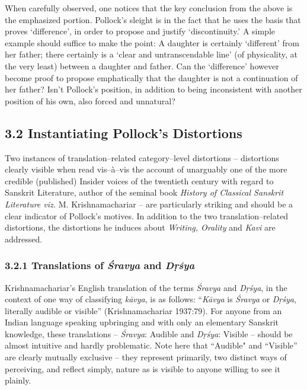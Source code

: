 \vskip 4pt

When carefully observed, one notices that the key conclusion from the above is the emphasized portion. Pollock’s sleight is in the fact that he uses the basis that proves ‘difference’, in order to propose and justify ‘discontinuity.’ A simple example should suffice to make the point: A daughter is certainly ‘different’ from her father; there certainly is a ‘clear and untranscendable line’ (of physicality, at the very least) between a daughter and father. Can the ‘difference’ however become proof to propose emphatically that the daughter is not a continuation of her father? Isn’t Pollock’s position, in addition to being inconsistent with another position of his own, also forced and unnatural?


\subsection*{3.2 Instantiating Pollock’s Distortions}

Two instances of translation–related category–level distortions – distortions clearly visible when read vis–à–vis the account of unarguably one of the more credible (published) Insider voices of the twentieth century with regard to Sanskrit Literature, author of the seminal book \textit{History of Classical Sanskrit Literature viz.} M. Krishnamachariar – are particularly striking and should be a clear indicator of Pollock’s motives. In addition to the two translation–related distortions, the distortions he induces about \textit{Writing, Orality} and \textit{Kavi} are addressed.

\subsubsection*{3.2.1 Translations of \textit{Śravya} and \textit{Dṛśya}}

Krishnamachariar’s English translation of the terms \textit{Śravya} and \textit{Dṛśya}, in the context of one way of classifying \textit{kāvya}, is as follows: “\textit{Kāvya} is \textit{Śravya} or \textit{Dṛśya}, literally audible or visible” (Krishnamachariar 1937:79). For anyone from an Indian language speaking upbringing and with only an elementary Sanskrit knowledge, these translations – \textit{Śravya}: Audible and \textit{Dṛśya}: Visible – should be almost intuitive and hardly problematic. Note here that “Audible" and “Visible” are clearly mutually exclusive – they represent primarily, two distinct ways of perceiving, and reflect simply, nature as is visible to anyone willing to see it plainly.

